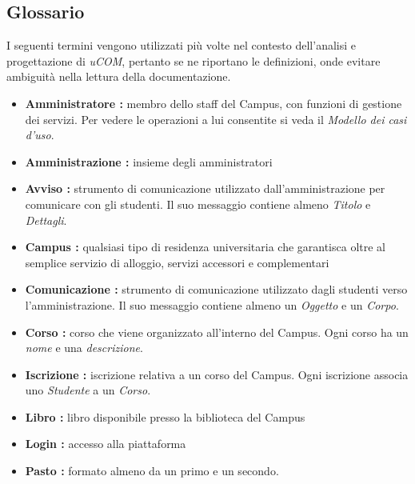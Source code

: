 \subsection{Glossario}

I seguenti termini vengono utilizzati più volte nel contesto dell'analisi e progettazione di \textit{uCOM}, pertanto se ne riportano le definizioni, onde evitare ambiguità nella lettura della documentazione.

\begin{itemize}
	
	\item \textbf{Amministratore :} membro dello staff del Campus, con funzioni di gestione dei servizi. Per vedere le operazioni a lui consentite si veda il \textit{Modello dei casi d'uso}.
	
	\item \textbf{Amministrazione : } insieme degli amministratori
	
	\item \textbf{Avviso :} strumento di comunicazione utilizzato dall'amministrazione per comunicare con gli studenti. Il suo messaggio contiene almeno \textit{Titolo} e \textit{Dettagli}.
	
	\item \textbf{Campus :} qualsiasi tipo di residenza universitaria che garantisca oltre al semplice servizio di alloggio, servizi accessori e complementari
	
	\item \textbf{Comunicazione :} strumento di comunicazione utilizzato dagli studenti verso l'amministrazione. Il suo messaggio contiene almeno un \textit{Oggetto} e un \textit{Corpo}.
	
	\item \textbf{Corso :} corso che viene organizzato all'interno del Campus. Ogni corso ha un \textit{nome} e una \textit{descrizione}.
	
	\item \textbf{Iscrizione :} iscrizione relativa a un corso del Campus. Ogni iscrizione associa uno \textit{Studente} a un \textit{Corso}.
		
	\item \textbf{Libro :} libro disponibile presso la biblioteca del Campus
	
	\item \textbf{Login :} accesso alla piattaforma
	
	\item \textbf{Pasto :} formato almeno da un primo e un secondo.
	

\end{itemize}
